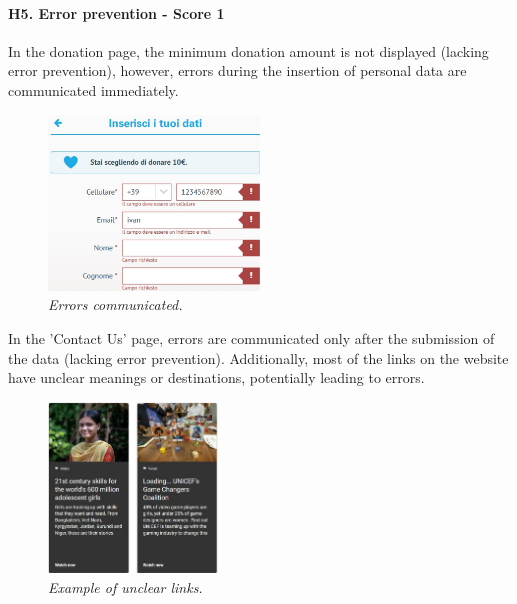 \paragraph{H5. Error prevention - Score 1}		In the donation page, the minimum donation amount is not displayed (lacking error prevention), however, errors during the insertion of personal data are communicated immediately.
\begin{figure}[!h]
	\begin{center}
		\includegraphics[width=0.5\textwidth]{Picture1.jpg}
		\captionsetup{font=small}
		\caption{\textit{Errors communicated.}}
	\end{center}
\end{figure}
\newline In the 'Contact Us' page, errors are communicated only after the submission of the data (lacking error prevention). Additionally, most of the links on the website have unclear meanings or destinations, potentially leading to errors.
\begin{figure}[!h]
	\begin{center}
		\includegraphics[width=0.4\textwidth]{Picture2.jpg}
		\captionsetup{font=small}
		\caption{\textit{Example of unclear links.}}
	\end{center}
\end{figure}
\newline
